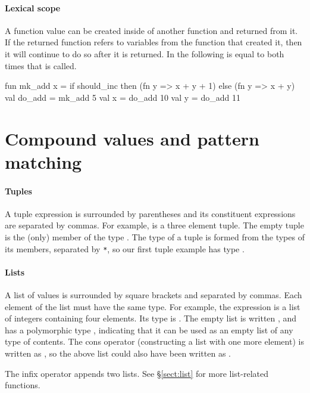 \documentclass[12pt,a4paper]{book}
\begin{document}
\paragraph{Lexical scope}
A function value can be created inside of another function and returned from
it. If the returned function refers to variables from the function that created
it, then it will continue to do so after it is returned. In the following  is equal to  both times that  is called.
\begin{smlcode}
fun mk_add x =
  if should_inc then (fn y => x + y + 1)
  else (fn y => x + y)
val do_add = mk_add 5
val x = do_add 10
val y = do_add 11
\end{smlcode}

\section{Compound values and pattern matching}
\label{sect:compound}

\paragraph{Tuples} A tuple expression is surrounded by parentheses and its constituent expressions are separated by commas. For example,  is a three element tuple. The empty tuple \smlinline{()} is the (only) member of the type . The type of a tuple is formed from the types of its members, separated by \texttt{*}, so our first tuple example has type .

\paragraph{Lists} A list of values is surrounded by square brackets and separated by commas. Each element of the list must have the same type. For example, the expression \smlinline{[1, 2+3, 0, 4]} is a list of integers containing four elements. Its type is . The empty list is written \smlinline{[]}, and has a polymorphic type , indicating that it can be used as an empty list of any type of contents. The cons operator (constructing a list with one more element) is written as \smlinline{::}, so the above list could also have been written as .

The  infix operator appends two lists. See \S\ref{sect:list} for more list-related functions.
\end{document}
